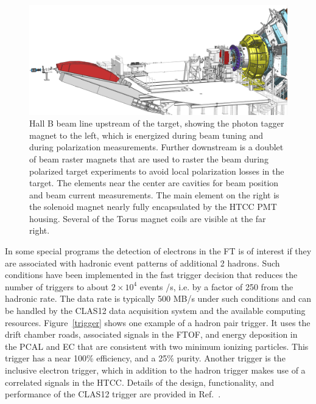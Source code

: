 \documentclass[final,3p,times,twocolumn,authoryear]{elsarticle}
\begin{document}
\begin{figure}[htbp!]
\centerline{\includegraphics[width=2.0\columnwidth]{beamline-1.png}}
\caption{Hall B beam line upstream of the target, showing the photon tagger magnet to the left, which is energized during beam 
tuning and during polarization measurements. Further downstream is a doublet of beam raster magnets that are used 
to raster the beam during polarized target experiments to avoid local polarization losses in the target. The elements near the 
center are cavities for beam position and beam current measurements. The main element 
on the right is the solenoid magnet nearly fully encapsulated by the HTCC PMT housing. Several of the Torus 
magnet coils are visible at the far right.  }
\label{beamline-upstream}
\end{figure}

In some special programs the detection of electrons in the FT is of interest if they 
are associated with hadronic event patterns of additional 2 hadrons. Such conditions have been implemented in the 
fast trigger decision that reduces the number of triggers to about $2 \times 10^4$ events /s, i.e. by  a factor of 
250 from the hadronic rate. The data rate is typically 500 MB/s under such conditions and can be handled by 
the CLAS12 data acquisition system and the available computing resources. 
Figure~\ref{trigger} shows one example of a hadron pair trigger. It uses the drift chamber roads, associated signals in the FTOF, 
and energy deposition in the PCAL and EC that are consistent with two minimum ionizing particles. This trigger has 
 a near 100\% efficiency, and a 25\% purity. Another trigger is the inclusive electron trigger, which in addition to the hadron trigger 
 makes use of a correlated signals in the HTCC.  
Details of the design, functionality, and performance of the CLAS12 trigger are provided in  Ref.~\cite{DAQ}. 
  
\end{document}
